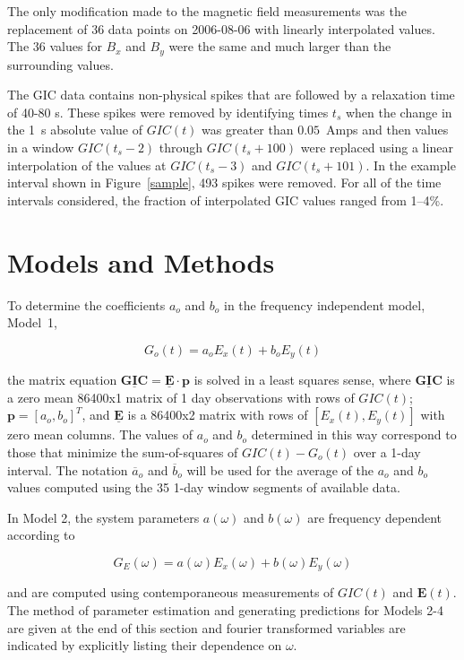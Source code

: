 \documentclass[draft,linenumbers]{agujournal2018}
\begin{document}
The only modification made to the magnetic field measurements was the replacement of 36 data points on 2006-08-06 with linearly interpolated values. The 36 values for $B_x$ and $B_y$ were the same and much larger than the surrounding values.

The GIC data contains non-physical spikes that are followed by a relaxation time of 40-80 s. These spikes were removed by identifying times $t_s$ when the change in the 1~s absolute value of $GIC(t)$ was greater than $0.05$~Amps and then values in a window $GIC(t_s-2)$ through $GIC(t_s+100)$ were replaced using a linear interpolation of the values at $GIC(t_s-3)$ and $GIC(t_s + 101)$. In the example interval shown in Figure~\ref{sample}, 493 spikes were removed. For all of the time intervals considered, the fraction of interpolated GIC values ranged from 1--4\%.

\section{Models and Methods}

To determine the coefficients $a_o$ and $b_o$ in the frequency independent model, Model~1,

\begin{linenomath*}
\begin{equation}
G_o(t) = a_oE_x(t) + b_oE_y(t)
\label{model1}
\end{equation}
\end{linenomath*}

\noindent
the matrix equation $\underline{\mathbf{GIC}} = \underline{\mathbf{E}}\cdot\mathbf{p}$ is solved in a least squares sense, where $\underline{\mathbf{GIC}}$ is a zero mean 86400x1 matrix of 1 day observations with rows of $GIC(t)$; $\mathbf{p} = [a_o,b_o]^T$, and $\underline{\mathbf{E}}$ is a 86400x2 matrix with rows of $[E_x(t), E_y(t)]$ with zero mean columns. The values of $a_o$ and $b_o$ determined in this way correspond to those that minimize the sum-of-squares of $GIC(t)-G_o(t)$ over a 1-day interval. \citep[][provided the mathematically equivalent closed-form equations for solving the matrix equation.]{Pulkkinen2007} The notation $\overline{a}_o$ and $\overline{b}_o$ will be used for the average of the $a_o$ and $b_o$ values computed using the 35 1-day window segments of available data.

In Model 2, the system parameters $a(\omega)$ and $b(\omega)$ are frequency dependent according to

\begin{linenomath*}
\begin{equation}
G_E(\omega) = a(\omega)E_x(\omega) + b(\omega)E_y(\omega)
\label{model2}
\end{equation}
\end{linenomath*}
\noindent
and are computed using contemporaneous measurements of $GIC(t)$ and $\mathbf{E}(t)$. The method of parameter estimation and generating predictions for Models 2-4 are given at the end of this section and fourier transformed variables are indicated by explicitly listing their dependence on $\omega$.
\end{document}
